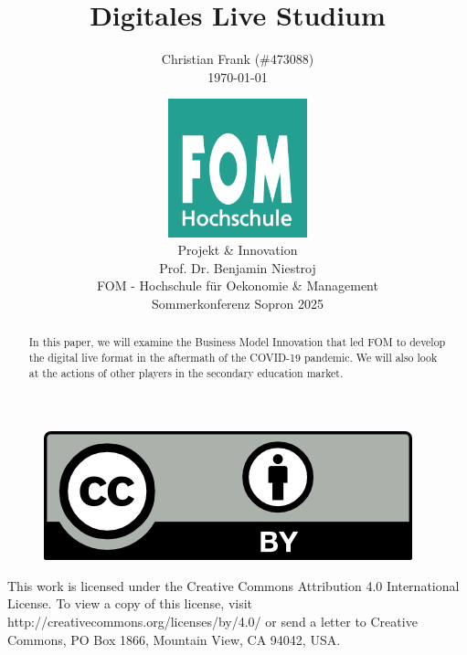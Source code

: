 \documentclass[12pt,a4paper,listof=totoc,bibliography=totoc]{scrartcl}
\newcommand\svthema{Digitales Live Studium}
\newcommand\svperson{Christian Frank (\#473088)}
\newcommand\svdatum{\today}
\newcommand\lvname{Projekt \& Innovation}
\newcommand\lvtyp{Sommerkonferenz Sopron 2025}
\newcommand\lvinst{FOM - Hochschule für Oekonomie \& Management}
\newcommand\lvbetr{Prof. Dr. Benjamin Niestroj}
\begin{document}
\title{ \huge\textbf{\svthema} }
\author{ {\svperson} \\ \svdatum }
\date{ \normalsize \centering \includegraphics[width=0.3\textwidth]{FOM}\\ {\lvname} \\ {\lvbetr} \\ {\lvinst} \\ {\lvtyp} }

\pagestyle{fancy}
\fancyhf{}
\fancyhf[ch]{\thepage}
\renewcommand\headrulewidth{0pt}

\maketitle
\thispagestyle{empty} %

\begin{abstract}
In this paper, we will examine the Business Model Innovation that led FOM to develop the digital live format in the aftermath of the COVID-19 pandemic. We will also look at the actions of other players in the secondary education market.

\end{abstract}

\vfill
\begin{figure}[h]
    \centering
    \includegraphics[]{CC-BY}
\end{figure}

This work is licensed under the Creative Commons Attribution 4.0 International License. To view a copy of this license, visit http://creativecommons.org/licenses/by/4.0/ or send a letter to Creative Commons, PO Box 1866, Mountain View, CA 94042, USA.
\end{document}
